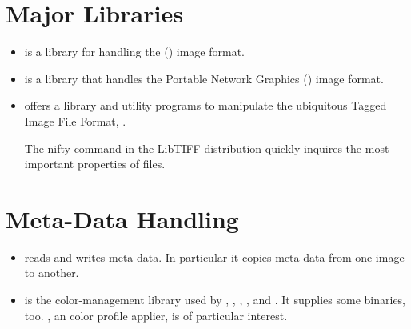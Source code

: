 \section[Libraries]{\label{sec:helpful-libraries}%
  Major Libraries}

\begin{itemize}
  \label{lib:jpeg}%
\item
   is a library for handling the  () image
  format.

  \label{lib:png}%
\item
   is a library that handles the Portable Network Graphics
  () image format.

  \label{lib:tiff}%
\item
   offers a library and utility programs to manipulate
  the ubiquitous Tagged Image File Format, .

  The nifty  command in the LibTIFF distribution quickly inquires the most
  important properties of  files.
\end{itemize}


\section[Meta-Data Handling]{\label{sec:meta-data-handling}%
  Meta-Data Handling}

\begin{itemize}
  \label{app:exiftool}%
\item
   reads and writes  meta-data.  In
  particular it copies meta-data from one image to another.

  \label{app:littlecms}%
\item
   is the color-management library used by ,
  , , \App, and \OtherApp.  It supplies some binaries,
  too.  , an  color profile applier, is of particular interest.
\end{itemize}


